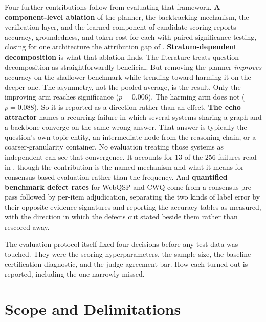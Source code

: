 Four further contributions follow from evaluating that framework. \textbf{A
component-level ablation} of the planner, the backtracking mechanism, the
verification layer, and the learned component of candidate scoring reports
accuracy, groundedness, and token cost for each with paired significance
testing, closing for one architecture the attribution gap of
. \textbf{Stratum-dependent decomposition} is what that
ablation finds. The literature treats question decomposition as
straightforwardly beneficial. But removing the planner \emph{improves} accuracy
on the shallower benchmark while trending toward harming it on the deeper one.
The asymmetry, not the pooled average, is the result. Only the improving arm
reaches significance ($p = 0.006$). The harming arm does not ($p = 0.088$). So
it is reported as a direction rather than an effect. \textbf{The echo attractor}
names a recurring failure in which several systems sharing a graph and a backbone converge on the same wrong answer. That answer is
typically the question's own topic entity, an intermediate node from the
reasoning chain, or a coarser-granularity container. No evaluation treating
those systems as independent can see that convergence. It accounts for $13$ of
the $256$ failures read in , though the contribution is the named
mechanism and what it means for consensus-based evaluation rather than the
frequency. And \textbf{quantified benchmark defect rates} for WebQSP and CWQ
come from a consensus pre-pass followed by per-item
adjudication, separating the two kinds of label error by their opposite evidence
signatures and reporting the accuracy tables as measured, with the direction in
which the defects cut stated beside them rather than rescored away.

The evaluation protocol itself fixed four decisions before any test data was
touched. They were the scoring hyperparameters, the sample size, the
baseline-certification diagnostic, and the judge-agreement bar. How each turned
out is reported, including the one narrowly missed.

\section{Scope and Delimitations}\label{sec:scope}

